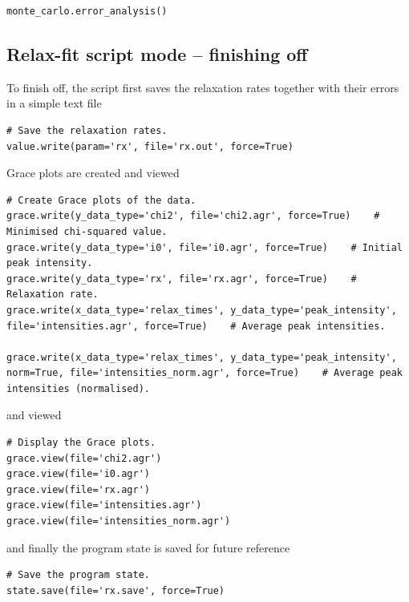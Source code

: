 \begin{lstlisting}[firstnumber=73]
monte_carlo.error_analysis()
\end{lstlisting}



\subsection{Relax-fit script mode -- finishing off}

To finish off, the script first saves the relaxation rates together with their errors in a simple text file

\begin{lstlisting}[firstnumber=75]
# Save the relaxation rates.
value.write(param='rx', file='rx.out', force=True)
\end{lstlisting}

Grace plots are created and viewed

\begin{lstlisting}[firstnumber=81]
# Create Grace plots of the data.
grace.write(y_data_type='chi2', file='chi2.agr', force=True)    # Minimised chi-squared value.
grace.write(y_data_type='i0', file='i0.agr', force=True)    # Initial peak intensity.
grace.write(y_data_type='rx', file='rx.agr', force=True)    # Relaxation rate.
grace.write(x_data_type='relax_times', y_data_type='peak_intensity', file='intensities.agr', force=True)    # Average peak intensities.

grace.write(x_data_type='relax_times', y_data_type='peak_intensity', norm=True, file='intensities_norm.agr', force=True)    # Average peak intensities (normalised).
\end{lstlisting}

and viewed

\begin{lstlisting}[firstnumber=88]
# Display the Grace plots.
grace.view(file='chi2.agr')
grace.view(file='i0.agr')
grace.view(file='rx.agr')
grace.view(file='intensities.agr')
grace.view(file='intensities_norm.agr')
\end{lstlisting}

and finally the program state is saved for future reference

\begin{lstlisting}[firstnumber=95]
# Save the program state.
state.save(file='rx.save', force=True)
\end{lstlisting}



